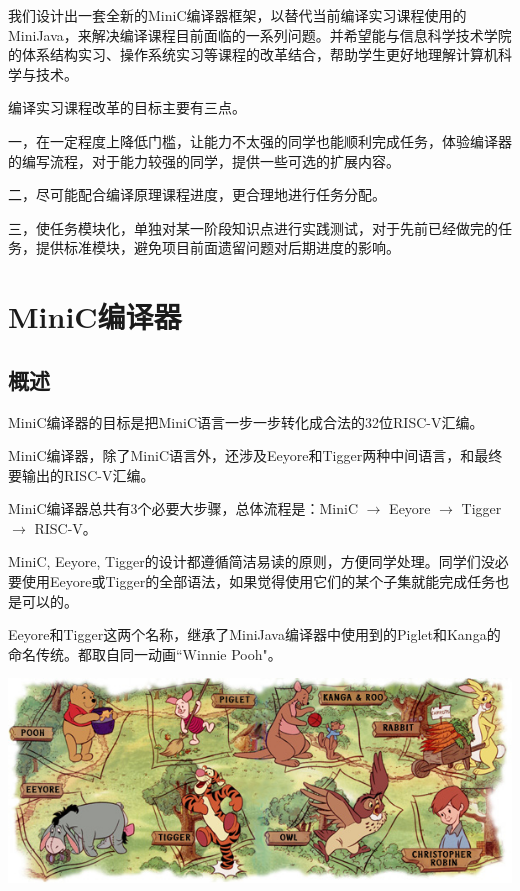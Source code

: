 \documentclass[a4paper]{ctexart}
\begin{document}
我们设计出一套全新的MiniC编译器框架，以替代当前编译实习课程使用的MiniJava，来解决编译课程目前面临的一系列问题。并希望能与信息科学技术学院的体系结构实习、操作系统实习等课程的改革结合，帮助学生更好地理解计算机科学与技术。

编译实习课程改革的目标主要有三点。

一，在一定程度上降低门槛，让能力不太强的同学也能顺利完成任务，体验编译器的编写流程，对于能力较强的同学，提供一些可选的扩展内容。

二，尽可能配合编译原理课程进度，更合理地进行任务分配。

三，使任务模块化，单独对某一阶段知识点进行实践测试，对于先前已经做完的任务，提供标准模块，避免项目前面遗留问题对后期进度的影响。

\newpage
\section{MiniC编译器}

\subsection{概述}

MiniC编译器的目标是把MiniC语言一步一步转化成合法的32位RISC-V汇编。

MiniC编译器，除了MiniC语言外，还涉及Eeyore和Tigger两种中间语言，和最终要输出的RISC-V汇编。

MiniC编译器总共有3个必要大步骤，总体流程是：MiniC $\rightarrow$ Eeyore $\rightarrow$ Tigger $\rightarrow$ RISC-V。

MiniC, Eeyore, Tigger的设计都遵循简洁易读的原则，方便同学处理。同学们没必要使用Eeyore或Tigger的全部语法，如果觉得使用它们的某个子集就能完成任务也是可以的。%

Eeyore和Tigger这两个名称，继承了MiniJava编译器中使用到的Piglet和Kanga的命名传统。都取自同一动画``Winnie Pooh"。

\begin{center}\includegraphics[width=15cm]{name} \end{center}
\end{document}
